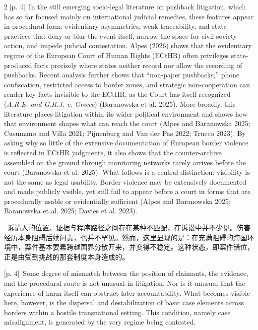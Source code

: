 \documentclass[10pt,a4paper]{article}
\begin{document}
\begin{paracol}{2}
{\scriptsize\color{gray} [p. 4]}\ In the still emerging socio-legal literature on pushback litigation, which has so far focused mainly on international judicial remedies, these features appear in procedural form: evidentiary asymmetries, weak traceability, and state practices that deny or blur the event itself, narrow the space for civil society action, and impede judicial contestation. Alpes (2026) shows that the evidentiary regime of the European Court of Human Rights (ECtHR) often privileges state-produced facts precisely where states neither record nor allow the recording of pushbacks. Recent analysis further shows that “non-paper pushbacks,” phone confiscation, restricted access to border zones, and strategic non-cooperation can render key facts invisible to the ECtHR, as the Court has itself recognized (\textit{A.R.E. and G.R.J. v. Greece}) (Baranowska et al. 2025). More broadly, this literature places litigation within its wider political environment and shows how that environment shapes what can reach the court (Alpes and Baranowska 2025; Cusumano and Villa 2021; Pijnenburg and Van der Pas 2022; Trucco 2023). By asking why so little of the extensive documentation of European border violence is reflected in ECtHR judgments, it also shows that the counter-archive assembled on the ground through monitoring networks rarely arrives before the court (Baranowska et al. 2025). What follows is a central distinction: visibility is not the same as legal usability. Border violence may be extensively documented and made publicly visible, yet still fail to appear before a court in forms that are procedurally usable or evidentially sufficient (Alpes and Baranowska 2025; Baranowska et al. 2025; Davies et al. 2023).\par
\switchcolumn*
{\scriptsize\color{gray} [p. 4]}\ 诉请人的位置、证据与程序路径之间存在某种不匹配，在诉讼中并不少见。伤害经历本身阻碍后续问责，也并不罕见。然而，这里显现的是：在充满阻碍的跨国环境中，案件基本要素跨越国界分散开来，并变得不稳定。这种状态，即案件错位，正是由受到挑战的那套制度本身造成的。\par
\switchcolumn
{\scriptsize\color{gray} [p. 4]}\ Some degree of mismatch between the position of claimants, the evidence, and the procedural route is not unusual in litigation. Nor is it unusual that the experience of harm itself can obstruct later accountability. What becomes visible here, however, is the dispersal and destabilization of basic case elements across borders within a hostile transnational setting. This condition, namely case misalignment, is generated by the very regime being contested.\par
\switchcolumn*
\end{paracol}
\end{document}
